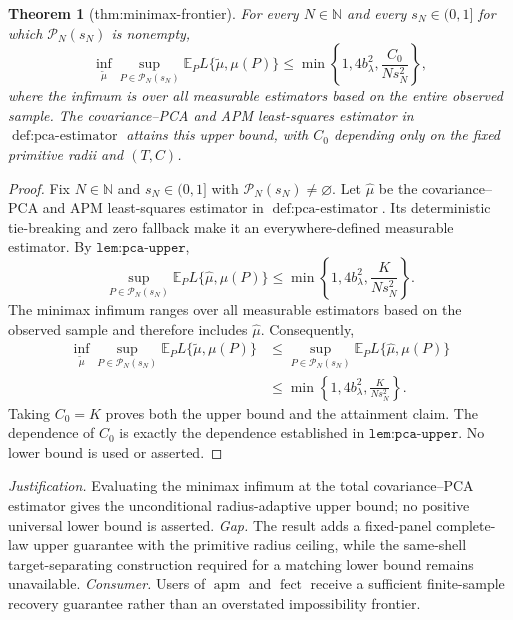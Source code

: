 \documentclass{article}
\newtheorem{theorem}{Theorem}
\begin{document}
\begin{theorem}[thm:minimax-frontier]\label{thm:minimax-frontier}
For every \(N\in\mathbb N\) and every \(s_N\in(0,1]\) for which \(\mathcal P_N(s_N)\) is nonempty,
\[
\inf_{\widetilde\mu}\sup_{P\in\mathcal P_N(s_N)}
\mathbb E_P L\{\widetilde\mu,\mu(P)\}
\le \min\!\left\{1,4b_\lambda^2,\frac{C_0}{Ns_N^2}\right\},
\]
where the infimum is over all measurable estimators based on the entire observed sample. The covariance--PCA and APM least-squares estimator in \(\operatorname{def:pca\text{-}estimator}\) attains this upper bound, with \(C_0\) depending only on the fixed primitive radii and \((T,C)\).
\end{theorem}
\begin{proof}
Fix \(N\in\mathbb N\) and \(s_N\in(0,1]\) with \(\mathcal P_N(s_N)\neq\varnothing\). Let \(\widehat\mu\) be the covariance--PCA and APM least-squares estimator in \(\operatorname{def:pca\text{-}estimator}\). Its deterministic tie-breaking and zero fallback make it an everywhere-defined measurable estimator. By \(\texttt{lem:pca-upper}\),
\[
\sup_{P\in\mathcal P_N(s_N)}
\mathbb E_PL\{\widehat\mu,\mu(P)\}
\leq\min\!\left\{1,4b_\lambda^2,\frac{K}{Ns_N^2}\right\}.
\tag{1}
\]
The minimax infimum ranges over all measurable estimators based on the observed sample and therefore includes \(\widehat\mu\). Consequently,
\[
\begin{aligned}
\inf_{\widetilde\mu}\sup_{P\in\mathcal P_N(s_N)}
\mathbb E_PL\{\widetilde\mu,\mu(P)\}
&\leq\sup_{P\in\mathcal P_N(s_N)}
\mathbb E_PL\{\widehat\mu,\mu(P)\}\\
&\leq\min\!\left\{1,4b_\lambda^2,\frac{K}{Ns_N^2}\right\}.
\end{aligned}
\]
Taking \(C_0=K\) proves both the upper bound and the attainment claim. The dependence of \(C_0\) is exactly the dependence established in \(\texttt{lem:pca-upper}\). No lower bound is used or asserted.
\end{proof}
\par\smallskip\noindent \textit{Justification.} Evaluating the minimax infimum at the total covariance--PCA estimator gives the unconditional radius-adaptive upper bound; no positive universal lower bound is asserted. \textit{Gap.} The result adds a fixed-panel complete-law upper guarantee with the primitive radius ceiling, while the same-shell target-separating construction required for a matching lower bound remains unavailable. \textit{Consumer.} Users of \(\operatorname{apm}\) and \(\operatorname{fect}\) receive a sufficient finite-sample recovery guarantee rather than an overstated impossibility frontier.
\end{document}
